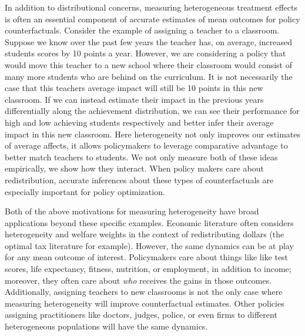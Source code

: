 \documentclass[12pt]{article}
\theoremstyle{definition}
\theoremstyle{definition}
\theoremstyle{definition}
\theoremstyle{definition}
\begin{document}
    In addition to distributional concerns, measuring heterogeneous treatment effects is often an essential component of accurate estimates of mean outcomes for policy counterfactuals. Consider the example of assigning a teacher to a classroom. Suppose we know over the past few years the teacher has, on average, increased students scores by 10 points a year. However, we are considering a policy that would move this teacher to a new school where their classroom would consist of many more students who are behind on the curriculum. It is not necessarily the case that this teachers average impact will still be 10 points in this new classroom. If we can instead estimate their impact in the previous years differentially along the achievement distribution, we can see their performance for high and low achieving students respectively and better infer their average impact in this new classroom. Here heterogeneity not only improves our estimates of average affects, it allows policymakers to leverage comparative advantage to better match teachers to students. We not only measure both of these ideas empirically, we show how they interact. When policy makers care about redistribution, accurate inferences about these types of counterfactuals are especially important for policy optimization.  

    Both of the above motivations for measuring heterogeneity have broad applications beyond these specific examples. Economic literature often considers heterogeneity and welfare weights in the context of redistributing dollars (the optimal tax literature for example). However, the same dynamics can be at play for any mean outcome of interest. Policymakers care about things like like test scores, life expectancy, fitness, nutrition, or employment, in addition to income; moreover, they often care about \emph{who} receives the gains in those outcomes. Additionally, assigning teachers to new classrooms is not the only case where measuring heterogeneity will improve counterfactual estimates. Other policies assigning practitioners like doctors, judges, police, or even firms to different heterogeneous populations will have the same dynamics.
    
    
    
\end{document}
